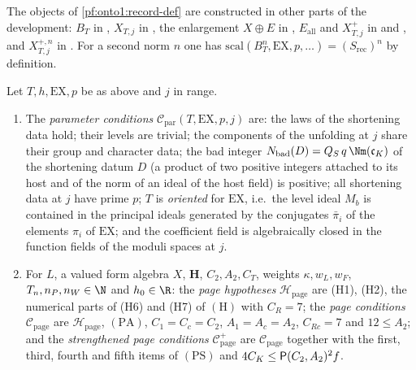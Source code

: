 The objects of \cref{pf:onto1:record-def} are constructed in other parts of the development:
$B_T$ in , $X_{T,j}$ in , the enlargement $X\oplus E$ in
, $E_{\mathrm{all}}$ and $X^+_{T,j}$ in  and
, and $X^{+,n}_{T,j}$ in . For a second norm
$n$ one has $\mathrm{scal}(B_T^n,\mathrm{EX},p,\dots)=(S_{\mathrm{rec}})^n$ by definition.

\begin{definition}\label{pf:onto1:parconds}
Let $T,h,\mathrm{EX},p$ be as above and $j$ in range.
\begin{enumerate}[label=(\roman*)]
\item The \emph{parameter conditions} $\mathcal C_{\mathrm{par}}(T,\mathrm{EX},p,j)$ are: the laws of the shortening data hold;
their levels are trivial; the components of the unfolding at $j$ share their group and character data; the bad integer
$N_{\mathrm{bad}}(D)=Q_S\,q\,\Nm(\mathfrak c_K)$ of the shortening datum $D$ (a product of two positive integers attached to its
host and of the norm of an ideal of the host field) is positive; all shortening data at $j$ have prime $p$; $T$ is
\emph{oriented} for $\mathrm{EX}$,
i.e.\ the level ideal $M_b$ is contained in the principal ideals generated by the conjugates $\bar\pi_i$ of the elements
$\pi_i$ of $\mathrm{EX}$; and the coefficient field is algebraically closed in the function fields of the moduli spaces at
$j$.
\item For $L$, a valued form algebra $X$, $\mathbf H$, $C_2,A_2,C_T$, weights $\kappa,w_L,w_F$, $T_n,n_P,n_W\in\N$ and
$h_0\in\R$: the \emph{page hypotheses} $\mathcal H_{\mathrm{page}}$ are (H1), (H2), the numerical parts of (H6) and (H7) of
$(\mathrm H)$ with $C_R=7$; the \emph{page conditions} $\mathcal C_{\mathrm{page}}$ are $\mathcal H_{\mathrm{page}}$, $(\mathrm{PA})$,
$C_1=C_c=C_2$, $A_1=A_c=A_2$, $C_{Rc}=7$ and $12\le A_2$; and the \emph{strengthened page conditions} $\mathcal
C^+_{\mathrm{page}}$ are $\mathcal C_{\mathrm{page}}$ together with the first, third, fourth and fifth items of $(\mathrm{PS})$ and
$4C_K\le\mathsf{P}(C_2,A_2)^2f$.
\end{enumerate}
\end{definition}

